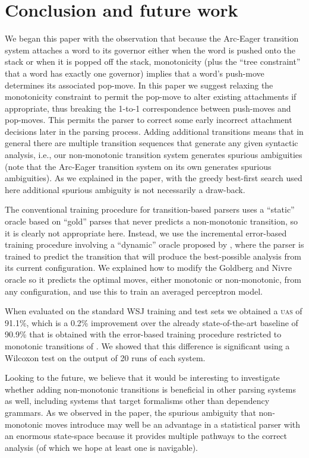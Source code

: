 \documentclass[11pt,letterpaper]{article}
\newcommand{\uas}{\textsc{uas}\xspace}
\newcommand{\note}[1]{\textcolor{red}{#1}}
\begin{document}
\section{Conclusion and future work}

\noindent
We began this paper with the observation that because the Arc-Eager transition system \citep{nivre:04}
attaches a word to its governor either when the word is pushed onto the stack or when it is
popped off the stack, monotonicity (plus the ``tree constraint'' that a word has exactly one governor)
implies that a word's push-move determines its associated pop-move. In this paper we suggest relaxing
the monotonicity constraint to permit the pop-move to alter existing attachments if appropriate,
thus breaking the 1-to-1 correspondence between push-moves and pop-moves.  This permits the parser
to correct some early incorrect attachment decisions later in the parsing process.
Adding additional transitions means
that in general there are multiple transition sequences that generate any given syntactic analysis,
i.e., our non-monotonic transition system generates spurious ambiguities (note that the
Arc-Eager transition system on its own generates spurious ambiguities).
As we explained in the paper, with the greedy best-first search used here additional
spurious ambiguity is
not necessarily a draw-back.

The conventional training procedure for transition-based parsers uses a ``static'' oracle
based on ``gold'' parses that never predicts a non-monotonic transition, so it is clearly not
appropriate here.  Instead, we use the incremental error-based training procedure involving
a ``dynamic'' oracle proposed by  \citet{goldberg:12}, where the parser is trained to
predict the transition that will produce
the best-possible analysis from its current configuration.  We explained how to modify the Goldberg
and Nivre oracle so it predicts the optimal moves, either monotonic or non-monotonic,
from any configuration, and use this to train an averaged perceptron model.

When evaluated on the standard WSJ training and test sets we obtained a \uas of 91.1\%,
which is a 0.2\% improvement over the already state-of-the-art baseline of
90.9\% that is obtained with the error-based training procedure restricted to monotonic transitions of
\citet{goldberg:12}.  We showed that this difference is significant using a
Wilcoxon
test on the output of 20 runs of each system.

Looking to the future, we believe that it would be interesting to investigate whether
adding non-monotonic transitions is beneficial in other parsing systems as well, including
systems that target formalisms other than dependency grammars.  As we observed
in the paper, the spurious ambiguity that non-monotonic moves introduce may well be an
advantage in a statistical parser with an enormous state-space because it provides
multiple pathways to the correct analysis (of which we hope at least one is navigable).
\end{document}
